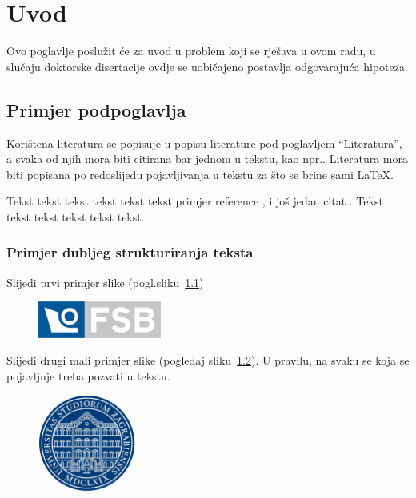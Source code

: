 \chapter{Uvod}

Ovo poglavlje poslužit će za uvod u problem koji se rješava u ovom
radu, u slučaju doktorske disertacije ovdje se uobičajeno postavlja odgovarajuća
hipoteza.

\section{Primjer podpoglavlja}
Korištena literatura se popisuje u popisu literature pod poglavljem
``Literatura'', a svaka od njih mora biti citirana bar jednom u tekstu, kao
npr.\cite{mastersthesis-minimal}. Literatura mora biti popisana po redoslijedu
pojavljivanja u tekstu za što se brine sami \LaTeX. 

Tekst tekst tekst tekst tekst tekst primjer reference
, i jo\v{s} jedan citat \cite{inbook-full}.
Tekst tekst tekst tekst tekst tekst.

\subsection{Primjer dubljeg strukturiranja teksta}
Slijedi prvi primjer slike (pogl.sliku~\ref{fig1})
\begin{figure}[h]
  \centering
  \includegraphics[height=1.2cm]{fsb_logo_n}\\
  \label{fig1}
\end{figure}
%
%
Slijedi drugi mali primjer slike (pogledaj sliku~\ref{fig2}). U pravilu, na
svaku se koja se pojavljuje treba pozvati u tekstu.
\begin{figure}
  \centering
  \includegraphics[height=3.2cm]{unizg_plavi_t2}\\
  \label{fig2}
\end{figure}

